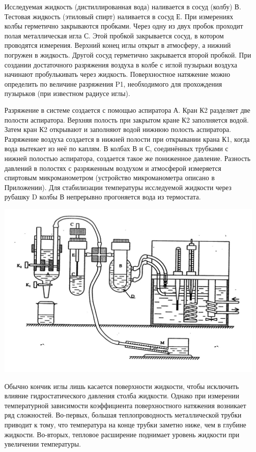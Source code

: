 \documentclass[a4paper,12pt]{article} %
\begin{document}
Исследуемая жидкость (дистиллированная вода) наливается в сосуд (колбу) В. Тестовая жидкость  (этиловый спирт) наливается  в сосуд Е.  При измерениях  колбы герметично закрываются  пробками.   Через одну из двух пробок  проходит полая металлическая игла С. Этой пробкой закрывается сосуд, в котором  проводятся измерения. Верхний конец иглы открыт в атмосферу, а нижний погружен в жидкость. Другой сосуд герметично закрывается второй пробкой. При создании достаточного  разряжения воздуха в колбе с иглой пузырьки воздуха начинают пробулькивать через жидкость. Поверхностное натяжение можно определить по величине разряжения P1, необходимого для прохождения пузырьков (при известном радиусе иглы).


Разряжение в системе создается с помощью аспиратора А. Кран К2 разделяет две полости аспиратора. Верхняя полость при закрытом кране К2  заполняется водой. Затем кран К2 открывают и заполняют водой  нижнюю полость  аспиратора.  Разряжение воздуха создается в нижней полости  при открывании крана К1, когда  вода вытекает из неё по каплям. В колбах В и С, соединённых трубками с нижней полостью аспиратора,  создается такое же пониженное давление. Разность давлений в полостях с разряженным воздухом и атмосферой измеряется спиртовым микроманометром (устройство микроманометра описано в Приложении). 
Для стабилизации температуры исследуемой жидкости через рубашку D колбы В непрерывно прогоняется вода из термостата.

\includegraphics[width=1\textwidth]{Scheme.jpg}

Обычно кончик иглы лишь касается поверхности жидкости, чтобы исключить влияние гидростатического давления столба жидкости. Однако при измерении температурной зависимости коэффициента поверхностного натяжения возникает ряд сложностей. Во-первых, большая теплопроводность металлической трубки приводит к тому, что температура на конце трубки заметно ниже, чем в глубине жидкости. Во-вторых, тепловое расширение поднимает уровень жидкости при увеличении температуры. 
\end{document}
